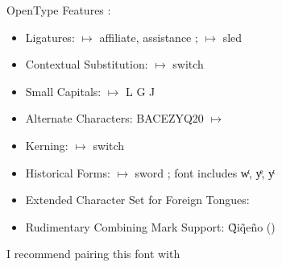 \documentclass[border=15pt]{standalone}
\begin{document}
\begin{minipage}{4in}
OpenType Features :
    \begin{itemize}
        \item Ligatures: {} $\mapsto$ a{\color{BrickRed}ffi}liate, a{\color{BrickRed}ssi}stance ; {} $\mapsto$ {\color{BrickRed}sl}ed
\item Contextual Substitution: {} $\mapsto$ switch
\item Small Capitals: {} $\mapsto$ {L{} G{} J{}}
\item Alternate Characters: BACEZYQ20 $\mapsto$ {}
\item Kerning: {} $\mapsto$ switch
\item Historical Forms: {} $\mapsto$ sword ; font includes wͭ, yͤ, yͭ
\item Extended Character Set for Foreign Tongues: {\color{BrickRed}}
\item Rudimentary Combining Mark Support: Q̃iq̃eño ({})
    \end{itemize}
    I recommend pairing this font with {}
\end{minipage}
\end{document}
